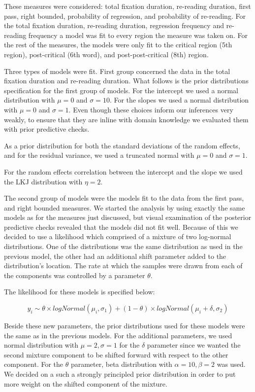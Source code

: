 \documentclass[11pt]{article} %
\begin{document}
These measures were considered: total fixation duration, re-reading
duration, first pass, right bounded, probability of regression, and probability of re-reading.
For the total fixation duration, re-reading duration, regression
frequency and re-reading frequency a model was fit to every region the
measure was taken on. For the rest of the measures, the models were only
fit to the critical region (5th region), post-critical (6th word), and
post-post-critical (8th) region.

Three types of models were fit. First group concerned the data in the
total fixation duration and re-reading duration. What follows is the
prior distributions specification for the first group of models. For the
intercept we used a normal distribution with \(\mu = 0\) and
\(\sigma = 10\). For the slopes we used a normal distribution with
\(\mu = 0\) and \(\sigma = 1\). Even though these choices inform our
inferences very weakly, to ensure that they are inline with domain
knowledge we evaluated them with prior predictive checks.

As a prior distribution for both the standard deviations of the random
effects, and for the residual variance, we used a truncated normal with
\(\mu = 0\) and \(\sigma = 1\).

For the random effects correlation between the intercept and the slope
we used the LKJ distribution \citep{lewandowski2009gener,stan2021}
with \(\eta = 2\).

The second group of models were the models fit to the data from the
first pass, and right bounded measures. We started
the analysis by using exactly the same models as for the measures just
discussed, but visual examination of the posterior predictive checks
revealed that the models did not fit well. Because of this we decided to
use a likelihood which comprised of a mixture of two log-normal
distributions. One of the distributions was the same distribution as
used in the previous model, the other had an additional shift parameter
added to the distribution's location. The rate at which the samples were
drawn from each of the components was controlled by a parameter
\(\theta\).

The likelihood for these models is specified below:

\[ y_{i} \sim \theta \times logNormal(\mu_{i}, \sigma_{1}) + (1 - \theta) \times logNormal(\mu_{i} + \delta, \sigma_{2}) \]

Beside these new parameters, the prior distributions used for these
models were the same as in the previous models. For the additional
parameters, we used normal distribution with \(\mu = 2, \sigma = 1\) for
the \(\delta\) parameter since we wanted the second mixture component to
be shifted forward with respect to the other component. For the
\(\theta\) parameter, beta distribution with \(\alpha = 10, \beta = 2\)
was used. We decided on a such a strongly principled prior distribution
in order to put more weight on the shifted component of the mixture.
\end{document}
